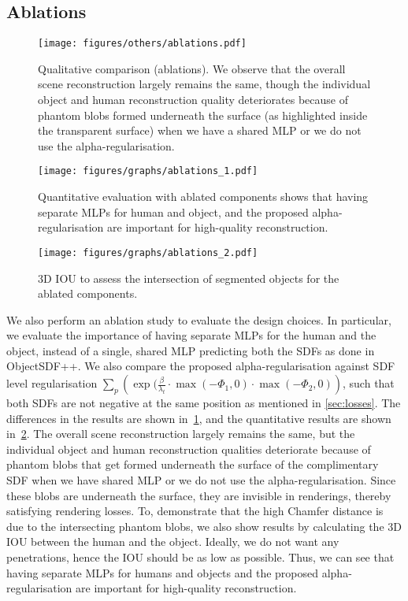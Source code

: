 \subsection{Ablations}
\begin{figure}
    \centering
    \texttt{[image: figures/others/ablations.pdf]}
    \caption[Ablations]{Qualitative comparison (ablations). We observe that the overall scene reconstruction largely remains the same, though the individual object and human reconstruction quality deteriorates because of phantom blobs formed underneath the surface (as highlighted inside the transparent surface) when we have a shared MLP or we do not use the alpha-regularisation.} 
    \label{fig:ablations}
\end{figure}

\begin{figure}
    \centering
    \texttt{[image: figures/graphs/ablations\_1.pdf]}
    \caption[Ablations]{Quantitative evaluation with ablated components shows that having separate MLPs for human and object, and the proposed alpha-regularisation are important for high-quality reconstruction.}
    \label{table:ablations} 
\end{figure}


\begin{figure}
    \centering
    \texttt{[image: figures/graphs/ablations\_2.pdf]}
    \caption[Ablations]{3D IOU to assess the intersection of segmented objects for the ablated components.}
    \label{table:3d_iou_intersection}
\end{figure}


We also perform an ablation study to evaluate the design choices.
In particular, we evaluate the importance of having separate MLPs for the human and the object, instead of a single, shared MLP predicting both the SDFs as done in ObjectSDF++.
We also compare the proposed alpha-regularisation against SDF level regularisation $\sum_p \left(\exp(\frac{\beta}{\lambda_t} \cdot \max(-\Phi_1, 0) \cdot \max(-\Phi_2, 0) \right)$, such that both SDFs are not negative at the same position as mentioned in \cref{sec:losses}. 
The differences in the results are shown in~\cref{fig:ablations}, and the quantitative results are shown in~\cref{table:ablations}.
The overall scene reconstruction largely remains the same, but the individual object and human reconstruction qualities deteriorate because of phantom blobs that get formed underneath the surface of the complimentary SDF when we have shared MLP or we do not use the alpha-regularisation. 
Since these blobs are underneath the surface, they are invisible in renderings, thereby satisfying rendering losses. 
To, demonstrate that the high Chamfer distance is due to the intersecting phantom blobs, we also show results by calculating the 3D IOU between the human and the object. 
Ideally, we do not want any penetrations, hence the IOU should be as low as possible. 
Thus, we can see that having separate MLPs for humans and objects and the proposed alpha-regularisation are important for high-quality reconstruction.


